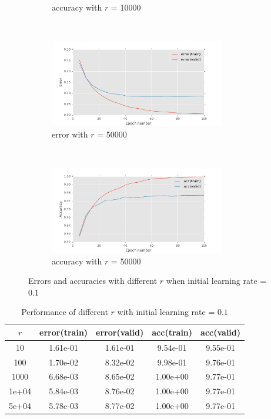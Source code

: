 \documentclass[11pt]{article}
\begin{document}
\begin{figure}[t!]
\begin{subfigure}[t]{0.45\textwidth}
        \caption{accuracy with $r$ = 10000}
    \end{subfigure} 
	~
    \begin{subfigure}[t]{0.45\textwidth}
        \centering
        \includegraphics[height=1.5in]{error_with_free_param_50000.pdf}
        \caption{error with $r$ = 50000}
    \end{subfigure}   
    ~
    \begin{subfigure}[t]{0.45\textwidth}
        \centering
        \includegraphics[height=1.5in]{acc_with_param_50000.pdf}
        \caption{accuracy with $r$ = 50000}
    \end{subfigure} 
    \caption{Errors and accuracies with different $r$ when initial learning rate = 0.1}    
    \label{fig:free_param}
\end{figure}
\begin{table}
\begin{center}
\begin{tabular}{ c c c c c} 
\hline
$r$ & error(train) & error(valid) & acc(train) & acc(valid)\\
\hline
\hline
10 & 1.61e-01 & 1.61e-01  &9.54e-01 & 9.55e-01 \\ 
100 &  1.70e-02  & 8.32e-02 & 9.98e-01 & 9.76e-01 \\
1000 &  6.68e-03 & 8.65e-02 & 1.00e+00 & 9.77e-01  \\
1e+04& 5.84e-03 & 8.76e-02 & 1.00e+00 & 9.77e-01 \\
5e+04& 5.78e-03 & 8.77e-02 & 1.00e+00 & 9.77e-01 \\
\end{tabular}
\caption{Performance of different $r$ with initial learning rate = $0.1$}
\label{tb:free_param}
\end{center}	
\end{table}
\end{document}
